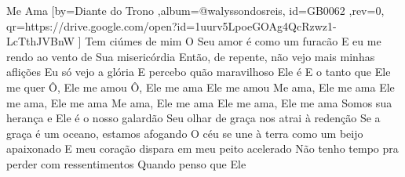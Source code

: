 \beginsong
{Me Ama %
}[by={Diante do Trono %
},album={@walyssondosreis},
id={GB0062 %
},rev={0}, %
qr={https://drive.google.com/open?id=1uurv5LpoeGOAg4QcRzwz1-LcTthJVBnW %
}]
\beginverse*
Tem ciúmes de mim
O Seu amor é como um furacão
E eu me rendo ao vento de Sua misericórdia
Então, de repente, não vejo mais minhas aflições
Eu só vejo a glória
E percebo quão maravilhoso Ele é
E o tanto que Ele me quer
\endverse
\beginverse*
Ô, Ele me amou
Ô, Ele me ama
Ele me amou
\endverse
\beginchorus
Me ama, Ele me ama
Ele me ama, Ele me ama
Me ama, Ele me ama
Ele me ama, Ele me ama
\endchorus
\beginverse*
Somos sua herança e Ele é o nosso galardão
Seu olhar de graça nos atrai à redenção
Se a graça é um oceano, estamos afogando
O céu se une à terra como um beijo apaixonado
E meu coração dispara em meu peito acelerado
Não tenho tempo pra perder com ressentimentos
Quando penso que Ele
\endverse


